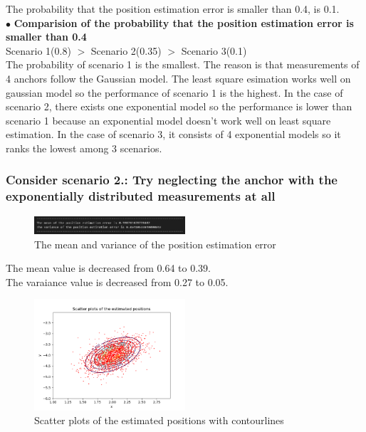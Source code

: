 \documentclass[a4paper]{article}
\begin{document}
The probability that the position estimation error is smaller than 0.4, is 0.1.\\

$\bullet$ \textbf{Comparision of the probability that the position estimation error is smaller than 0.4}\\

\hspace{0.5cm} Scenario 1(0.8) $>$ Scenario 2(0.35) $>$ Scenario 3(0.1)\\

\hspace{0.5cm} The probability of scenario 1 is the smallest. The reason is that measurements of 4 anchors follow the Gaussian model. The least square esimation works well on gaussian model so the performance of scenario 1 is the highest. In the case of scenario 2, there exists one exponential model so the performance is lower than scenario 1 because an exponential model doesn't work well on least square estimation. In the case of scenario 3, it consists of 4 exponential models so it ranks the lowest among 3 scenarios.

\clearpage
\subsubsection{Consider scenario 2.: Try neglecting the anchor with the exponentially distributed measurements at all}
\begin{figure}[h]
	\begin{center}
		\includegraphics[width=0.5\textwidth]{mean_variance_neglect.jpg}
		\caption{The mean and variance of the position estimation error}
	\end{center}
\end{figure}
\noindent
The mean value is decreased from 0.64 to 0.39.\\
The varaiance value is decreased from 0.27 to 0.05.\\
\begin{figure}[h]
	\begin{center}
		\includegraphics[width=0.5\textwidth]{neglect1.png}
		\caption{Scatter plots of the estimated positions with contourlines}
	\end{center}
\end{figure}
\end{document}
